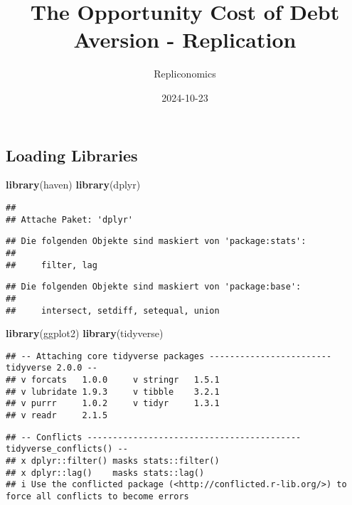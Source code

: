 \documentclass[
]{article}
\title{The Opportunity Cost of Debt Aversion - Replication}
\author{Repliconomics}
\date{2024-10-23}
\newenvironment{Shaded}{\begin{snugshade}}{\end{snugshade}}
\newcommand{\FunctionTok}[1]{\textcolor[rgb]{0.13,0.29,0.53}{\textbf{#1}}}
\newcommand{\NormalTok}[1]{#1}
\begin{document}
\maketitle

\subsection{Loading Libraries}\label{loading-libraries}

\begin{Shaded}
\begin{Highlighting}[]
\FunctionTok{library}\NormalTok{(haven)}
\FunctionTok{library}\NormalTok{(dplyr)}
\end{Highlighting}
\end{Shaded}

\begin{verbatim}
## 
## Attache Paket: 'dplyr'
\end{verbatim}

\begin{verbatim}
## Die folgenden Objekte sind maskiert von 'package:stats':
## 
##     filter, lag
\end{verbatim}

\begin{verbatim}
## Die folgenden Objekte sind maskiert von 'package:base':
## 
##     intersect, setdiff, setequal, union
\end{verbatim}

\begin{Shaded}
\begin{Highlighting}[]
\FunctionTok{library}\NormalTok{(ggplot2)}
\FunctionTok{library}\NormalTok{(tidyverse)}
\end{Highlighting}
\end{Shaded}

\begin{verbatim}
## -- Attaching core tidyverse packages ------------------------ tidyverse 2.0.0 --
## v forcats   1.0.0     v stringr   1.5.1
## v lubridate 1.9.3     v tibble    3.2.1
## v purrr     1.0.2     v tidyr     1.3.1
## v readr     2.1.5
\end{verbatim}

\begin{verbatim}
## -- Conflicts ------------------------------------------ tidyverse_conflicts() --
## x dplyr::filter() masks stats::filter()
## x dplyr::lag()    masks stats::lag()
## i Use the conflicted package (<http://conflicted.r-lib.org/>) to force all conflicts to become errors
\end{verbatim}
\end{document}
